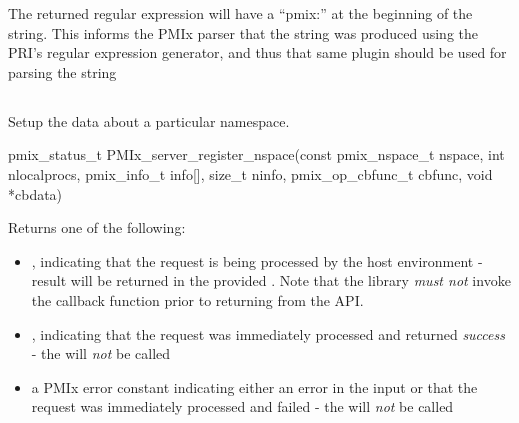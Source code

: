 \adviceuserstart
The returned regular expression will have a ``pmix:'' at the beginning of the string. This informs the \ac{PMIx} parser that the string was produced using the \ac{PRI}'s regular expression generator, and thus that same plugin should be used for parsing the string
\adviceuserend

\subsection{}

\summary

Setup the data about a particular namespace.

\format

\cspecificstart
\begin{codepar}
pmix_status_t
PMIx_server_register_nspace(const pmix_nspace_t nspace,
                        int nlocalprocs,
                        pmix_info_t info[], size_t ninfo,
                        pmix_op_cbfunc_t cbfunc, void *cbdata)
\end{codepar}
\cspecificend

\begin{arglist}
\end{arglist}

Returns one of the following:

\begin{itemize}
    \item {}, indicating that the request is being processed by the host environment - result will be returned in the provided . Note that the library \emph{must not} invoke the callback function prior to returning from the \ac{API}.
    \item {}, indicating that the request was immediately processed and returned \textit{success} - the  will \textit{not} be called
    \item a PMIx error constant indicating either an error in the input or that the request was immediately processed and failed - the  will \textit{not} be called
\end{itemize}


